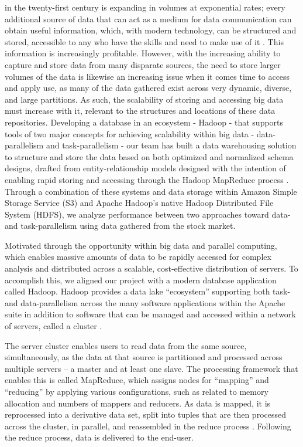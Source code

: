 \documentclass[journal]{IEEEtran}
\begin{document}
	 in the twenty-first century is expanding in volumes
	at exponential rates; every additional source of data that can act as a
	medium for data communication can obtain useful information, which,
	with modern technology, can be structured and stored, accessible to any
	who have the skills and need to make use of it \cite{BigDataComputing}. 
	This information is increasingly profitable. 
	However, with the increasing ability to capture and store data from many
	disparate sources, the need to store larger volumes of the data is
	likewise an increasing issue when it comes time to access and apply use,
	as many of the data gathered exist across very dynamic, diverse, and
	large partitions. 
	As such, the scalability of storing and accessing big data must increase
	with it, relevant to the structures and locations of these data repositories. 
	Developing a database in an ecosystem - Hadoop - that supports tools of
	two major concepts for achieving scalability within big data -
	data-parallelism and task-parallelism - our team has built a data
	warehousing solution to structure and store the data based on both
	optimized and normalized schema designs, drafted from entity-relationship
	models designed with the intention of enabling rapid storing and accessing
	through the Hadoop MapReduce process \cite{BigDataComputing}. 
	Through a combination of these systems and data storage within
	Amazon Simple Storage Service (S3) and Apache Hadoop's native Hadoop
	Distributed File System (HDFS), we analyze performance between two
	approaches toward data- and task-parallelism using data gathered from
	the stock market.
	
	Motivated through the opportunity within big data and parallel computing,
	which enables massive amounts of data to be rapidly accessed for complex
	analysis and distributed across a scalable, cost-effective distribution of
	servers. To accomplish this, we aligned our project with a modern database
	application called Hadoop. Hadoop provides a data lake ``ecosystem'' 
	supporting both task- and data-parallelism across the many software
	applications within the Apache suite in addition to software that can 
	be managed and accessed within a network of servers, called a cluster \cite{Intel, BigDataComputing}.
	
	The server cluster enables users to read data from the same source,
	simultaneously, as the data at that source is partitioned and
	processed across multiple servers – a master and at least one slave. 
	The processing framework that enables this is called MapReduce, 
	which assigns nodes for ``mapping'' and ``reducing'' by applying 
	various configurations, such as related to memory allocation and numbers
	of mappers and reducers. As data is mapped, it is reprocessed into a derivative 
	data set, split into tuples that are then processed across the cluster, in parallel, and reassembled in the reduce process \cite{MappingReducing}. Following the reduce process, data is delivered to 
	the end-user.
	
\end{document}
